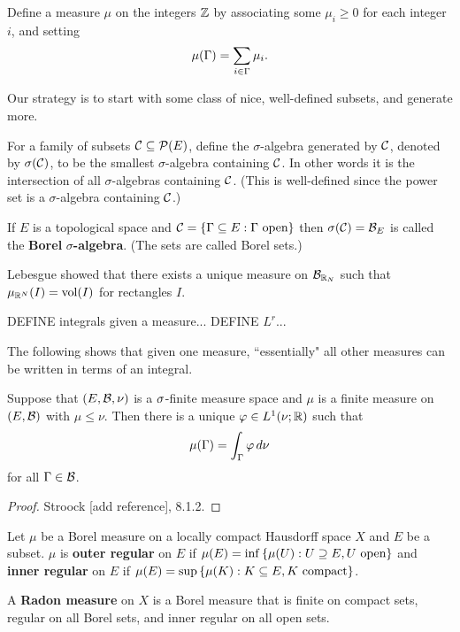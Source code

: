 \begin{ex}
Define a measure $\mu$ on the integers $\Z$ by associating some $\mu_i\geq 0$ for each integer $i$, and setting
\[
\mu(\Ga)=\sum_{i\in \Ga}\mu_i.
\]
\end{ex}

Our strategy is to start with some class of nice, well-defined subsets, and generate more.
\begin{df}
For a family of subsets $\cal C\subeq \cal P(E)$, define the
$\sigma$-algebra generated by $\cal C$, denoted by $\sigma(\cal C)$, to be the smallest $\sigma$-algebra containing $\cal C$. In other words it is the intersection of all $\sigma$-algebras containing $\cal C$. (This is well-defined since the power set is a $\sigma$-algebra containing $\cal C$.)

If $E$ is a topological space and $\cal C=\{\Ga\subeq E:\Ga\text{ open}\}$ then $\sigma(\cal C)=\cal B_E$ is called the \textbf{Borel }$\sigma$\textbf{-algebra}. (The sets are called Borel sets.)
\end{df}
Lebesgue showed that there exists a unique measure on $\cal B_{\R_N}$ such that $\mu_{\R^N}(I)=\vol(I)$ for rectangles $I$. 

DEFINE integrals given a measure... DEFINE $L^r$...

The following shows that given one measure, ``essentially" all other measures can be written in terms of an integral.
\begin{thm}
Suppose that $(E,\cal B,\nu)$ is a $\si$-finite measure space and $\mu$ is a finite measure on $(E,\cal B)$ with $\mu\le \nu$. Then there is a unique $\ph\in L^1(\nu;\R)$ such that 
\[
\mu(\Ga)=\int_{\Ga} \ph\,d\nu
\]
for all $\Ga\in \cal B$. %
\end{thm}
\begin{proof}
Stroock [add reference], 8.1.2.
\end{proof}
\begin{df}
Let $\mu$ be a Borel measure on a locally compact Hausdorff space $X$ and $E$ be a subset. $\mu$ is \textbf{outer regular} on $E$ if $\mu(E)=\inf\set{\mu(U)}{U\supeq E,U\text{ open}}$ and \textbf{inner regular} on $E$ if $\mu(E)=\sup\set{\mu(K)}{K\subeq E,K\text{ compact}}$.

A \textbf{Radon measure} on $X$ is a Borel measure that is finite on compact sets, regular on all Borel sets, and inner regular on all open sets.
\end{df}
